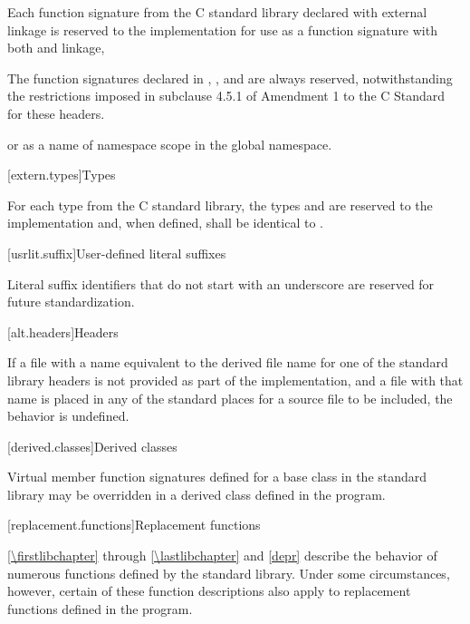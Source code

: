 \pnum
Each function signature from the C standard library declared with
%
external linkage
is reserved to the implementation for use as
a function signature with both
%
and
%
linkage,
\begin{footnote}
The function signatures declared in
%
,
,
and
are always reserved, notwithstanding the restrictions imposed in subclause
4.5.1 of Amendment 1 to the C Standard for these headers.
\end{footnote}
or as a name of namespace scope in the global namespace.

[extern.types]{Types}

\pnum
For each type  from the C standard library,
the types
and
are reserved to the implementation and, when defined,
shall be identical to
.

[usrlit.suffix]{User-defined literal suffixes}

\pnum
Literal suffix identifiers that do not start with an underscore are reserved for future standardization.

[alt.headers]{Headers}

\pnum
If a file with a name
equivalent to the derived file name for one of the \Cpp{} standard library headers
is not provided as part of the implementation, and a file with that name
is placed in any of the standard places for a source file to be included,
the behavior is undefined.%
%

[derived.classes]{Derived classes}

\pnum
Virtual member function signatures defined
%
for a base class in the \Cpp{} standard
%
%
library may be overridden in a derived class defined in the program.

[replacement.functions]{Replacement functions}

\pnum
{}%
\ref{\firstlibchapter} through \ref{\lastlibchapter} and \ref{depr}
describe the behavior of numerous functions defined by
the \Cpp{} standard library.
Under some circumstances,
%
however, certain of these function descriptions also apply to replacement functions defined
in the program.

